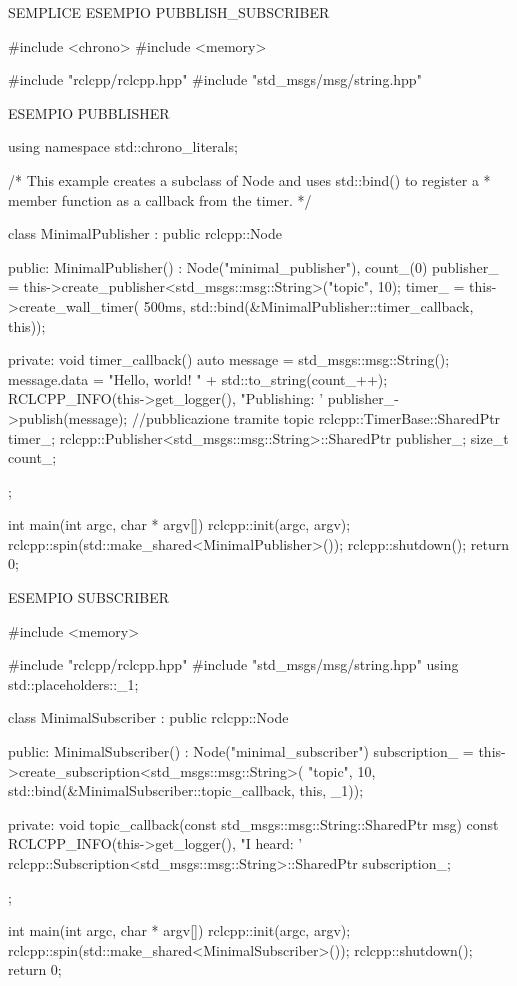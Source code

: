 SEMPLICE ESEMPIO PUBBLISH_SUBSCRIBER


#include <chrono>
#include <memory>

#include "rclcpp/rclcpp.hpp"
#include "std_msgs/msg/string.hpp"

ESEMPIO PUBBLISHER

using namespace std::chrono_literals;

/* This example creates a subclass of Node and uses std::bind() to register a
* member function as a callback from the timer. */

class MinimalPublisher : public rclcpp::Node
{
  public:
    MinimalPublisher()
    : Node("minimal_publisher"), count_(0)
    {
      publisher_ = this->create_publisher<std_msgs::msg::String>("topic", 10);
      timer_ = this->create_wall_timer(
      500ms, std::bind(&MinimalPublisher::timer_callback, this));
    }

  private:
    void timer_callback()
    {
      auto message = std_msgs::msg::String();
      message.data = "Hello, world! " + std::to_string(count_++);
      RCLCPP_INFO(this->get_logger(), "Publishing: '%
      publisher_->publish(message); //pubblicazione tramite topic
    }
    rclcpp::TimerBase::SharedPtr timer_;
    rclcpp::Publisher<std_msgs::msg::String>::SharedPtr publisher_;
    size_t count_;
  };

  int main(int argc, char * argv[])
  {
    rclcpp::init(argc, argv);
    rclcpp::spin(std::make_shared<MinimalPublisher>());
    rclcpp::shutdown();
    return 0;
  }
  
  ESEMPIO SUBSCRIBER
  
#include <memory>

#include "rclcpp/rclcpp.hpp"
#include "std_msgs/msg/string.hpp"
using std::placeholders::_1;

class MinimalSubscriber : public rclcpp::Node
{
  public:
    MinimalSubscriber()
    : Node("minimal_subscriber")
    {
      subscription_ = this->create_subscription<std_msgs::msg::String>(
      "topic", 10, std::bind(&MinimalSubscriber::topic_callback, this, _1));
    }

  private:
    void topic_callback(const std_msgs::msg::String::SharedPtr msg) const
    {
      RCLCPP_INFO(this->get_logger(), "I heard: '%
    }
    rclcpp::Subscription<std_msgs::msg::String>::SharedPtr subscription_;
};

int main(int argc, char * argv[])
{
  rclcpp::init(argc, argv);
  rclcpp::spin(std::make_shared<MinimalSubscriber>());
  rclcpp::shutdown();
  return 0;
}